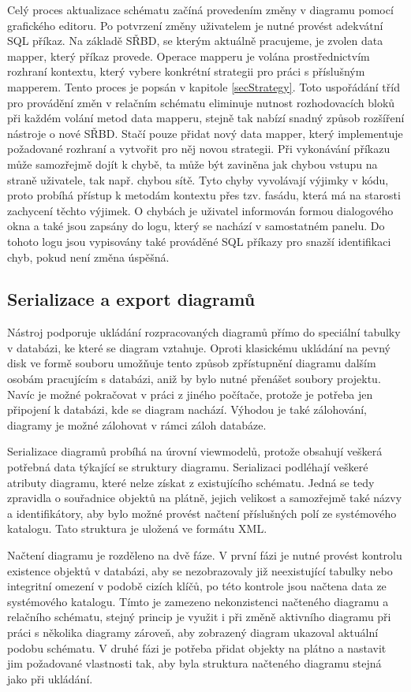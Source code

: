 \documentclass[czech,bachelor,public,dept460,male,oneside]{diploma}
\begin{document}
	Celý proces aktualizace schématu začíná provedením změny v diagramu pomocí grafického editoru. Po potvrzení změny uživatelem je nutné provést adekvátní SQL příkaz. Na základě SŘBD, se kterým aktuálně pracujeme, je zvolen data mapper, který příkaz provede. Operace mapperu je volána prostřednictvím rozhraní kontextu, který vybere konkrétní strategii pro práci s příslušným mapperem. Tento proces je popsán v kapitole \ref{secStrategy}. Toto uspořádání tříd pro provádění změn v relačním schématu eliminuje nutnost rozhodovacích bloků při každém volání metod data mapperu, stejně tak nabízí snadný způsob rozšíření nástroje o nové SŘBD. Stačí pouze přidat nový data mapper, který implementuje požadované rozhraní a vytvořit pro něj novou strategii. Při vykonávání příkazu může samozřejmě dojít k chybě, ta může být zaviněna jak chybou vstupu na straně uživatele, tak např. chybou sítě. Tyto chyby vyvolávají výjimky v kódu, proto probíhá přístup k metodám kontextu přes tzv. fasádu, která má na starosti zachycení těchto výjimek. O chybách je uživatel informován formou dialogového okna a také jsou zapsány do logu, který se nachází v samostatném panelu. Do tohoto logu jsou vypisovány také prováděné SQL příkazy pro snazší identifikaci chyb, pokud není změna úspěšná.
	
	\subsection{Serializace a export diagramů}
	Nástroj podporuje ukládání rozpracovaných diagramů přímo do speciální tabulky v databázi, ke které se diagram vztahuje. Oproti klasickému ukládání na pevný disk ve formě souboru umožňuje tento způsob zpřístupnění diagramu dalším osobám pracujícím s databázi, aniž by bylo nutné přenášet soubory projektu. Navíc je možné pokračovat v práci z jiného počítače, protože je potřeba jen připojení k databázi, kde se diagram nachází. Výhodou je také zálohování, diagramy je možné zálohovat v rámci záloh databáze.
	
	Serializace diagramů probíhá na úrovní viewmodelů, protože obsahují veškerá potřebná data týkající se struktury diagramu. Serializaci podléhají veškeré atributy diagramu, které nelze získat z existujícího schématu. Jedná se tedy zpravidla o souřadnice objektů na plátně, jejich velikost a samozřejmě také názvy a identifikátory, aby bylo možné provést načtení příslušných polí ze systémového katalogu. Tato struktura je uložená ve formátu XML.
	
	Načtení diagramu je rozděleno na dvě fáze. V první fázi je nutné provést kontrolu existence objektů v databázi, aby se nezobrazovaly již neexistující tabulky nebo integritní omezení v podobě cizích klíčů, po této kontrole jsou načtena data ze systémového katalogu. Tímto je zamezeno nekonzistenci načteného diagramu a relačního schématu, stejný princip je využit i při změně aktivního diagramu při práci s několika diagramy zároveň, aby zobrazený diagram ukazoval aktuální podobu schématu. V druhé fázi je potřeba přidat objekty na plátno a nastavit jim požadované vlastnosti tak, aby byla struktura načteného diagramu stejná jako při ukládání.
	
\end{document}
